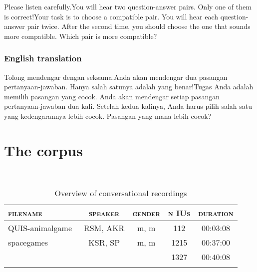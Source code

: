 Please listen carefully.\newline You will hear two question-answer pairs. \newline Only one of them is correct!\newline Your task is to choose a compatible pair.
\newline You will hear each question-answer pair twice. \newline After the second time, you should choose the one that sounds more compatible.
\newline
Which pair is more compatible?

\subsubsection{English translation}

Tolong mendengar dengan seksama.\newline  Anda akan mendengar dua pasangan pertanyaan-jawaban. \newline  Hanya salah satunya adalah yang benar!\newline Tugas Anda adalah memilih pasangan yang cocok.
\newline Anda akan mendengar setiap pasangan pertanyaan-jawaban dua kali. \newline  Setelah kedua kalinya, Anda harus pilih salah satu yang kedengarannya lebih cocok.
\newline
Pasangan yang mana lebih cocok?

\newpage
\section{The corpus}
\label{sec:the-corpus}
~
\vspace*{-\baselineskip}

\begin{table}[h!]
	\caption{Overview of conversational recordings}
	\label{Overview_conv}
	\begin{tabular}{lcccc}
		\lsptoprule
			\textsc{filename} & 	\textsc{speaker} & 	\textsc{gender} & 	\textsc{n IUs} & 	\textsc{duration} \\
		\midrule
		QUIS-animalgame\ & RSM, AKR & m, m & 112 & 00:03:08 \\
		spacegames  & KSR, SP & m, m & 1215 & 00:37:00 \\\midrule
		& & & 1327 & 00:40:08 \\ 
		\lspbottomrule
	\end{tabular}
\end{table}

